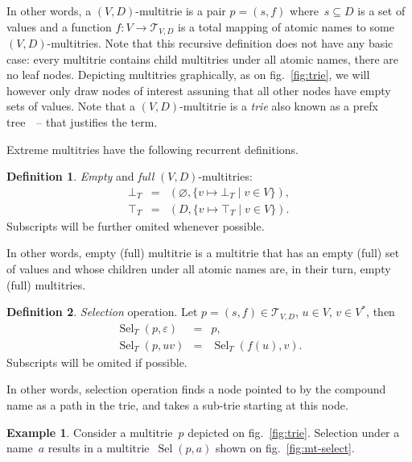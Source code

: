 \documentclass{article}
\theoremstyle{definition}
\newtheorem{Df}{Definition}
\newtheorem{Ex}{Example}
\newcommand{\setcharmt}{T}
\newcommand{\setsymbol}[3]{\mathcal{#1}_{#2,#3}}
\newcommand{\setmt}[2]{\setsymbol{\setcharmt}{#1}{#2}}
\newcommand{\select}{\operatorname{Sel}}
\begin{document}
In other words, a $(V,D)$-multitrie is a pair $p = (s, f)$ where~$s\subseteq D$
is a set of values and a function $f: V \to \setmt{V}{D}$ is a total mapping of
atomic names to some $(V,D)$-multitries. Note that this recursive definition does
not have any basic case: every multitrie contains child multitries
under all atomic names, there are no leaf nodes.
Depicting multitries graphically, as on fig.~\ref{fig:trie}, we will however
only draw nodes of interest assuning that all other nodes have empty sets of
values.  Note that a $(V,D)$-multitrie is a \emph{trie} also known as
a prefx tree~\cite{bib:knuth-trie}~-- that justifies the term.

Extreme multitries have the following recurrent definitions.
\begin{Df}\label{df:mt-extreme}
\emph{Empty} and \emph{full} $(V,D)$-multitries:
\begin{eqnarray*}
  \bot_\setcharmt & = &
      ( \varnothing, \{ v \mapsto \bot_\setcharmt \mid v\in V \} ) , \\
  \top_\setcharmt & = &
      ( D,           \{ v \mapsto \top_\setcharmt \mid v\in V \} ) .
\end{eqnarray*}
Subscripts will be further omited whenever possible.
\end{Df}
In other words, empty (full) multitrie is a multitrie that has an empty
(full) set of values and whose children under all atomic names are, in their
turn, empty (full) multitries.

\begin{Df}\label{df:mt-select}
\emph{Selection} operation. Let $p=(s,f) \in \setmt{V}{D}$, $u\in V$,
$v\in V^\ast$, then
\begin{eqnarray*}
  \select_\setcharmt(p, \varepsilon) & = & p , \\
  \select_\setcharmt(p, u v) & = & \select_\setcharmt(f(u), v) .
\end{eqnarray*}
Subscripts will be omited if possible.
\end{Df}

In other words, selection operation finds a node pointed to by the
compound name as a path in the trie, and takes a sub-trie starting
at this node.

\begin{Ex}\label{ex:mt-select}
Consider a multitrie~$p$ depicted on fig.~\ref{fig:trie}. Selection under a
name~$a$ results in a multitrie~$\select(p,a)$ shown on
fig.~\ref{fig:mt-select}.
\end{Ex}
\end{document}
